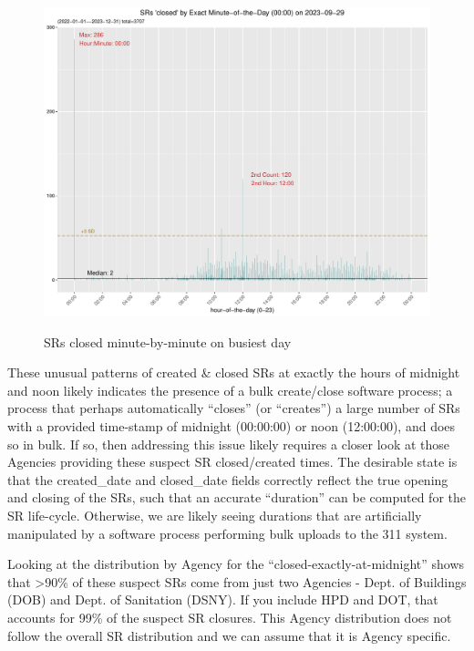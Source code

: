 \documentclass[12pt, titlepage]{article}
\begin{document}
{ 	\begin{figure}[tbp]
		 \centering
		  \caption{SRs closed minute-by-minute on busiest day}
		 \includegraphics[width=\textwidth]{SR_closed_by_minute_of_busiest_day.pdf}
		 \label{fig:busiestclosed}
	\end{figure}	

	These unusual patterns of created \& closed SRs at exactly the hours of midnight and noon likely indicates
	the presence of a bulk create/close software process; a process that perhaps automatically ``closes'' (or ``creates'') 
	a large number of SRs with a provided time-stamp of midnight (00:00:00) or noon (12:00:00), and does so in bulk. 
	If so, then addressing this issue likely requires a closer look at those Agencies providing these suspect SR closed/created times.
	 The desirable state is that the created\_date and closed\_date fields correctly reflect the true opening and closing 
	 of the SRs, such that an accurate ``duration'' can be computed for the SR life-cycle. Otherwise, we are likely seeing 
	 durations that are artificially manipulated by a software process performing bulk uploads to the 311 system.

	Looking at the distribution by Agency for the ``closed-exactly-at-midnight'' shows that \textgreater{}90\% of these suspect SRs come from just two Agencies - Dept. of 
	Buildings (DOB) and Dept. of Sanitation (DSNY). If you include HPD and DOT, that accounts for 99\% of the suspect SR closures. This Agency
	distribution does not follow the overall SR distribution and we can assume that it is Agency specific. 

}
\end{document}
